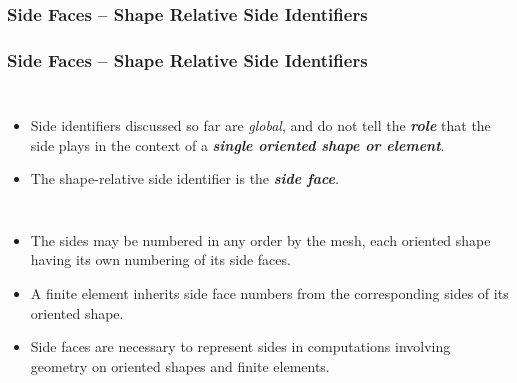 \documentclass[compress]{beamer}
\begin{document}
\subsubsection{Side Faces -- Shape Relative Side Identifiers}

\begin{frame}
  \frametitle{Side Faces -- Shape Relative Side Identifiers}
  \begin{columns}
      \begin{itemize}[<+->]
        \item Side identifiers discussed so far are \emph{global}, and do not tell the \emph{\textbf{role}} that the side plays
          in the context of a \emph{\textbf{single oriented shape or element}}.
        \item The shape-relative side identifier is the \emph{\textbf{side face}}.
      \end{itemize}
       {}
               {}
  \end{columns}
  \begin{itemize}[<+->]
    \item The sides may be numbered in any order by the mesh, each oriented shape having its own numbering of its side faces.
    \item A finite element inherits side face numbers from the corresponding sides of its oriented shape.
    \item Side faces are necessary to represent sides in computations involving geometry on oriented shapes and finite elements.
  \end{itemize}
\end{frame}
 
\end{document}
